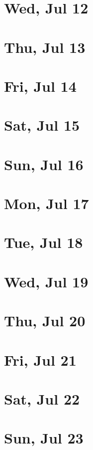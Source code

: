 	\section{Wed, Jul 12}
		
	\section{Thu, Jul 13}
		
	\section{Fri, Jul 14}
		
	\section{Sat, Jul 15}
		
	\section{Sun, Jul 16}
		
	\section{Mon, Jul 17}
		
	\section{Tue, Jul 18}
		
	\section{Wed, Jul 19}
		
	\section{Thu, Jul 20}
		
	\section{Fri, Jul 21}
		
	\section{Sat, Jul 22}
		
	\section{Sun, Jul 23}
		
